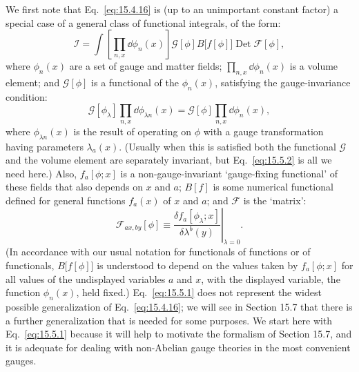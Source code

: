 We first note that Eq.~\eqref{eq:15.4.16} is (up to an unimportant constant
factor) a special case of a general class of functional integrals, of the form:
\begin{equation}
  \mathcal I=\int\left[\prod_{n,x}\dd\phi_n(x)\right]
  \mathcal G[\phi]B\bigl[f[\phi]\bigr]\operatorname{Det}\mathcal F[\phi],
  \tag{15.5.1}\label{eq:15.5.1}
\end{equation}
where $\phi_n(x)$ are a set of gauge and matter fields;
$\prod_{n,x}\dd\phi_n(x)$ is a volume element; and $\mathcal G[\phi]$ is a
functional of the $\phi_n(x)$, satisfying the gauge-invariance condition:
\begin{equation}
  \mathcal G[\phi_\lambda]\prod_{n,x}\dd\phi_{\lambda n}(x)
  =\mathcal G[\phi]\prod_{n,x}\dd\phi_n(x),
  \tag{15.5.2}\label{eq:15.5.2}
\end{equation}
where $\phi_{\lambda n}(x)$ is the result of operating on $\phi$ with a gauge
transformation having parameters $\lambda_a(x)$. (Usually when this is
satisfied both the functional $\mathcal G$ and the volume element are
separately invariant, but Eq.~\eqref{eq:15.5.2} is all we need here.) Also,
$f_a[\phi;x]$ is a non-gauge-invariant `gauge-fixing functional' of these
fields that also depends on $x$ and $a$; $B[f]$ is some numerical
functional defined for general functions $f_a(x)$ of $x$ and $a$;
and $\mathcal F$ is the `matrix':
\begin{equation}
  \mathcal F_{a x,b y}[\phi]
  \equiv\left.\frac{\delta f_a[\phi_\lambda;x]}
  {\delta\lambda^b(y)}\right|_{\lambda=0}.
  \tag{15.5.3}\label{eq:15.5.3}
\end{equation}
(In accordance with our usual notation for functionals of functions or of
functionals, $B\bigl[f[\phi]\bigr]$ is understood to depend on the values taken
by $f_a[\phi;x]$ for all values of the undisplayed variables $a$ and
$x$, with the displayed variable, the function $\phi_n(x)$, held fixed.)
Eq.~\eqref{eq:15.5.1} does not represent the widest possible generalization of
Eq.~\eqref{eq:15.4.16}; we will see in Section 15.7 that there is a further
generalization that is needed for some purposes. We start here with
Eq.~\eqref{eq:15.5.1} because it will help to motivate the formalism of
Section 15.7, and it is adequate for dealing with non-Abelian gauge theories
in the most convenient gauges.

